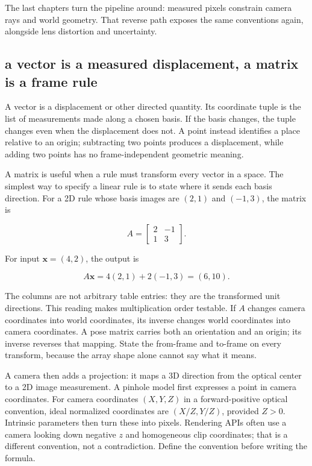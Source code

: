 The last chapters turn the pipeline around: measured pixels constrain camera rays and world geometry. That reverse path exposes the same conventions again, alongside lens distortion and uncertainty.

\subsection{a vector is a measured displacement, a matrix is a frame rule}\label{02-foundations-ii-ch032-a-vector-is-a-measured-displacement-a-matrix-is-a-frame-rule}

\hypertarget{02-foundations-ii-ch032-a-vector-is-a-measured-displacement-a-matrix-is-a-frame-rule}{}

A vector is a displacement or other directed quantity. Its coordinate tuple is the list of measurements made along a chosen basis. If the basis changes, the tuple changes even when the displacement does not. A point instead identifies a place relative to an origin; subtracting two points produces a displacement, while adding two points has no frame-independent geometric meaning.

A matrix is useful when a rule must transform every vector in a space. The simplest way to specify a linear rule is to state where it sends each basis direction. For a 2D rule whose basis images are \((2,1)\) and \((-1,3)\), the matrix is

\[
A=\begin{bmatrix}2&-1\\1&3\end{bmatrix}.
\]

For input \(\mathbf{x}=(4,2)\), the output is

\[
A\mathbf{x}=4(2,1)+2(-1,3)=(6,10).
\]

The columns are not arbitrary table entries: they are the transformed unit directions. This reading makes multiplication order testable. If \(A\) changes camera coordinates into world coordinates, its inverse changes world coordinates into camera coordinates. A pose matrix carries both an orientation and an origin; its inverse reverses that mapping. State the from-frame and to-frame on every transform, because the array shape alone cannot say what it means.

A camera then adds a projection: it maps a 3D direction from the optical center to a 2D image measurement. A pinhole model first expresses a point in camera coordinates. For camera coordinates \((X,Y,Z)\) in a forward-positive optical convention, ideal normalized coordinates are \((X/Z,Y/Z)\), provided \(Z>0\). Intrinsic parameters then turn these into pixels. Rendering APIs often use a camera looking down negative \(z\) and homogeneous clip coordinates; that is a different convention, not a contradiction. Define the convention before writing the formula.

